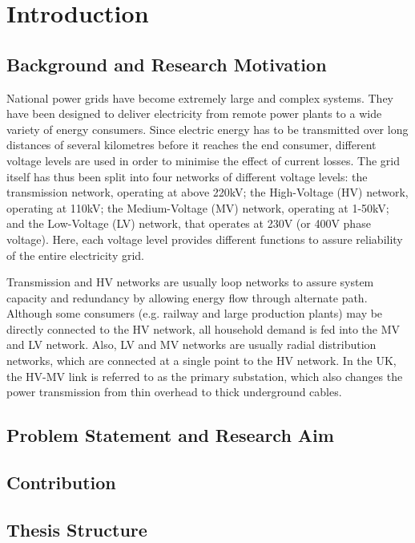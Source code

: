 \chapter{Introduction}
\label{ch-introduction}



\section{Background and Research Motivation}
\label{ch-introduction:sec:background-and-research-motivation}

National power grids have become extremely large and complex systems. They have been designed to deliver electricity from remote power plants to a wide variety of energy consumers. Since electric energy has to be transmitted over long distances of several kilometres before it reaches the end consumer, different voltage levels are used in order to minimise the effect of current losses. The grid itself has thus been split into four networks of different voltage levels: the transmission network, operating at above 220kV; the High-Voltage (HV) network, operating at 110kV; the Medium-Voltage (MV) network, operating at 1-50kV; and the Low-Voltage (LV) network, that operates at 230V (or 400V phase voltage). Here, each voltage level provides different functions to assure reliability of the entire electricity grid.

Transmission and HV networks are usually loop networks to assure system capacity and redundancy by allowing energy flow through alternate path. Although some consumers (e.g. railway and large production plants) may be directly connected to the HV network, all household demand is fed into the MV and LV network. Also, LV and MV networks are usually radial distribution networks, which are connected at a single point to the HV network. In the UK, the HV-MV link is referred to as the primary substation, which also changes the power transmission from thin overhead to thick underground cables.


\section{Problem Statement and Research Aim}

\section{Contribution}



\section{Thesis Structure}

